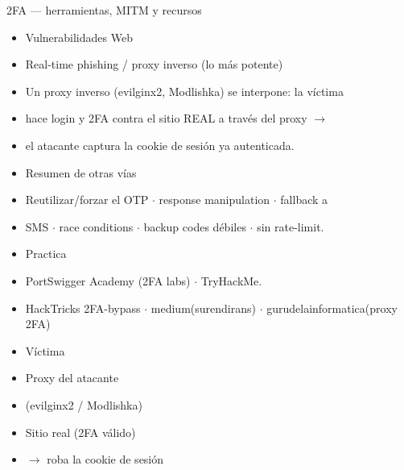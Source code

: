 \documentclass[aspectratio=169,10pt]{beamer}
\begin{document}
\begin{frame}[allowframebreaks]{2FA --- herramientas, MITM y recursos}
\small
  \begin{itemize}
  \item Vulnerabilidades Web
  \item Real-time phishing / proxy inverso (lo más potente)
  \item Un proxy inverso (evilginx2, Modlishka) se interpone: la víctima
  \item hace login y 2FA contra el sitio REAL a través del proxy $\rightarrow$
  \item el atacante captura la cookie de sesión ya autenticada.
  \item Resumen de otras vías
  \item Reutilizar/forzar el OTP $\cdot$ response manipulation $\cdot$ fallback a
  \item SMS $\cdot$ race conditions $\cdot$ backup codes débiles $\cdot$ sin rate-limit.
  \item Practica
  \item PortSwigger Academy (2FA labs) $\cdot$ TryHackMe.
  \item HackTricks 2FA-bypass $\cdot$ medium(surendirans) $\cdot$ gurudelainformatica(proxy 2FA)
  \item Víctima
  \item Proxy del atacante
  \item (evilginx2 / Modlishka)
  \item Sitio real (2FA válido)
  \item $\rightarrow$ roba la cookie de sesión
  \end{itemize}
\end{frame}
\end{document}
